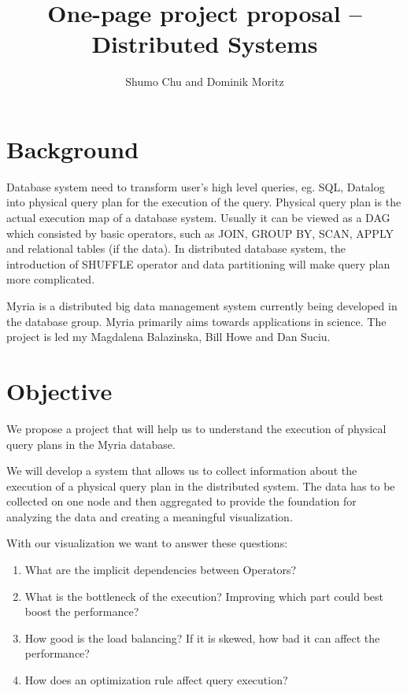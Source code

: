 \documentclass[11pt]{article}
\begin{document}

\title{One-page project proposal \--- Distributed Systems}
\author{Shumo Chu and Dominik Moritz}
\date{}

\maketitle

\section*{Background}

Database system need to transform user's high level queries, eg. SQL, Datalog into physical query plan for the execution of the query. Physical query plan is the actual execution map of a database system. Usually it can be viewed as a DAG which consisted by basic operators, such as JOIN, GROUP BY, SCAN, APPLY and relational tables (if the data). In distributed database system, the introduction of SHUFFLE operator and data partitioning will make query plan more complicated.

Myria is a distributed big data management system currently being developed in the database group. Myria primarily aims towards applications in science. The project is led my Magdalena Balazinska, Bill Howe and Dan Suciu.


\section*{Objective}

We propose a project that will help us to understand the execution of physical query plans in the Myria database.

We will develop a system that allows us to collect information about the execution of a physical query plan in the distributed system. The data has to be collected on one node and then aggregated to provide the foundation for analyzing the data and creating a meaningful visualization.

With our visualization we want to answer these questions:

\begin{enumerate}
	\item What are the implicit dependencies between Operators?
	\item What is the bottleneck of the execution? Improving which part could best boost the performance?
	\item How good is the load balancing? If it is skewed, how bad it can affect the performance?
	\item How does an optimization rule affect query execution?
\end{enumerate}
\end{document}

